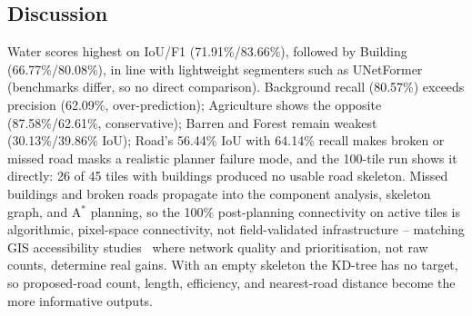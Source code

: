 \documentclass[runningheads]{llncs}
\begin{document}
\subsection{Discussion}
Water scores highest on IoU/F1 (71.91\%/83.66\%), followed by Building (66.77\%/80.08\%), in line with lightweight segmenters such as UNetFormer~\cite{wang2022unet} (benchmarks differ, so no direct comparison). Background recall (80.57\%) exceeds precision (62.09\%, over-prediction); Agriculture shows the opposite (87.58\%/62.61\%, conservative); Barren and Forest remain weakest (30.13\%/39.86\% IoU); Road's 56.44\% IoU with 64.14\% recall makes broken or missed road masks a realistic planner failure mode, and the 100-tile run shows it directly: 26 of 45 tiles with buildings produced no usable road skeleton. Missed buildings and broken roads propagate into the component analysis, skeleton graph, and A$^{*}$ planning, so the 100\% post-planning connectivity on active tiles is algorithmic, pixel-space connectivity, not field-validated infrastructure -- matching GIS accessibility studies~\cite{verma2020,kapoor2021} where network quality and prioritisation, not raw counts, determine real gains. With an empty skeleton the KD-tree has no target, so proposed-road count, length, efficiency, and nearest-road distance become the more informative outputs.
\end{document}
